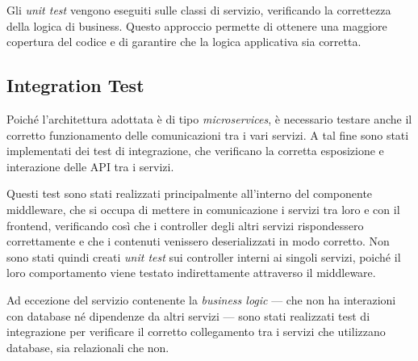 Gli \textit{unit test} vengono eseguiti sulle classi di servizio, verificando la correttezza della logica di business. Questo approccio permette di ottenere una maggiore copertura del codice e di garantire che la logica applicativa sia corretta.

\subsection{Integration Test}

Poiché l’architettura adottata è di tipo \textit{microservices}, è necessario testare anche il corretto funzionamento delle comunicazioni tra i vari servizi. A tal fine sono stati implementati dei test di integrazione, che verificano la corretta esposizione e interazione delle API tra i servizi.

Questi test sono stati realizzati principalmente all’interno del componente middleware, che si occupa di mettere in comunicazione i servizi tra loro e con il frontend, verificando così che i controller degli altri servizi rispondessero correttamente e che i contenuti venissero deserializzati in modo corretto.  
Non sono stati quindi creati \textit{unit test} sui controller interni ai singoli servizi, poiché il loro comportamento viene testato indirettamente attraverso il middleware.

Ad eccezione del servizio contenente la \textit{business logic} — che non ha interazioni con database né dipendenze da altri servizi — sono stati realizzati test di integrazione per verificare il corretto collegamento tra i servizi che utilizzano database, sia relazionali che non.

